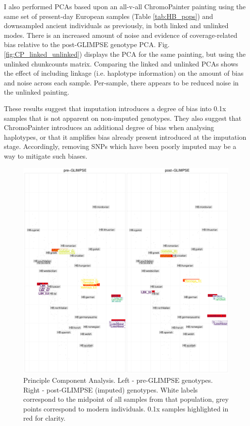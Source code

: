I also performed PCAs based upon an all-v-all ChromoPainter painting using the same set of present-day European samples (Table \ref{tab:HB_pops}) and downsampled ancient individuals as previously, in both linked and unlinked modes. There is an increased amount of noise and evidence of coverage-related bias relative to the post-GLIMPSE genotype PCA. Fig. \ref{fig:CP_linked_unlinked}) displays the PCA for the same painting, but using the unlinked chunkcounts matrix. Comparing the linked and unlinked PCAs shows the effect of including linkage (i.e. haplotype information) on the amount of bias and noise across each sample. Per-sample, there appears to be reduced noise in the unlinked painting.

These results suggest that imputation introduces a degree of bias into 0.1x samples that is not apparent on non-imputed genotypes. They also suggest that ChromoPainter introduces an additional degree of bias when analysing haplotypes, or that it amplifies bias already present introduced at the imputation stage. Accordingly, removing SNPs which have been poorly imputed may be a way to mitigate such biases.

\begin{figure}[htp]
    \centering
    \includegraphics[width=1.0\textwidth]{../images/chapter1/pre_post_GLIMPSE_PCA.pdf}
    \caption{Principle Component Analysis. Left - pre-GLIMPSE genotypes. Right - post-GLIMPSE (imputed) genotypes. White labels correspond to the midpoint of all samples from that population, grey points correspond to modern individuals. 0.1x samples highlighted in red for clarity.}
    \label{fig:pre_GLIMPSE_PCA}
\end{figure}

